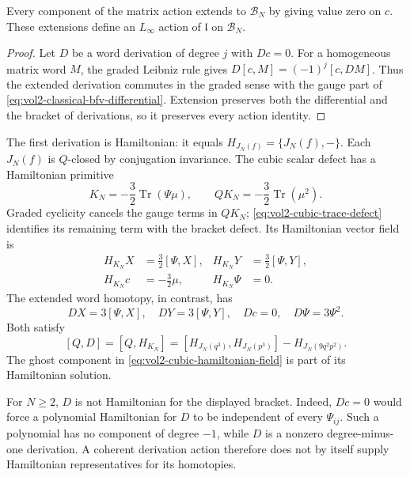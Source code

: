 \begin{proposition}\label{prop:vol2-action-bfv-extension}
Every component of the matrix action extends to $\mathcal B_N$
by giving value zero on $c$. These extensions define an
$L_\infty$ action of $\mathfrak l$ on $\mathcal B_N$.
\end{proposition}
\begin{proof}
Let $D$ be a word derivation of degree $j$ with $Dc=0$.
For a homogeneous matrix word $M$, the graded Leibniz rule gives
$D[c,M]=(-1)^j[c,DM]$. Thus the extended derivation commutes
in the graded sense with the gauge part of
\eqref{eq:vol2-classical-bfv-differential}. Extension preserves
both the differential and the bracket of derivations, so it
preserves every action identity.
\end{proof}

The first derivation is Hamiltonian: it equals
$H_{J_N(f)}=\{J_N(f),-\}$. Each $J_N(f)$ is $Q$-closed by
conjugation invariance. The cubic scalar defect has a
Hamiltonian primitive
\begin{equation}\label{eq:vol2-cubic-hamiltonian-primitive}
 K_N=-\frac32\operatorname{Tr}(\Psi\mu),\qquad
 QK_N=-\frac32\operatorname{Tr}(\mu^2).
\end{equation}
Graded cyclicity cancels the gauge terms in $QK_N$;
\eqref{eq:vol2-cubic-trace-defect} identifies its remaining
term with the bracket defect. Its Hamiltonian vector field is
\begin{equation}\label{eq:vol2-cubic-hamiltonian-field}
 \begin{aligned}
 H_{K_N}X&=\tfrac32[\Psi,X],&
 H_{K_N}Y&=\tfrac32[\Psi,Y],\\
 H_{K_N}c&=-\tfrac32\mu,&H_{K_N}\Psi&=0.
 \end{aligned}
\end{equation}
The extended word homotopy, in contrast, has
\begin{equation}\label{eq:vol2-cubic-derived-field}
 DX=3[\Psi,X],\quad DY=3[\Psi,Y],
 \quad Dc=0,\quad D\Psi=3\Psi^2.
\end{equation}
Both satisfy
\[
 [Q,D]=[Q,H_{K_N}]
   =[H_{J_N(q^3)},H_{J_N(p^3)}]-H_{J_N(9q^2p^2)}.
\]
The ghost component in \eqref{eq:vol2-cubic-hamiltonian-field}
is part of its Hamiltonian solution.

For $N\geq2$, $D$ is not Hamiltonian for the displayed bracket.
Indeed, $Dc=0$ would force a polynomial Hamiltonian for $D$ to
be independent of every $\Psi_{ij}$. Such a polynomial has no
component of degree $-1$, while $D$ is a nonzero degree-minus-one
derivation. A coherent derivation action therefore does not by
itself supply Hamiltonian representatives for its homotopies.

